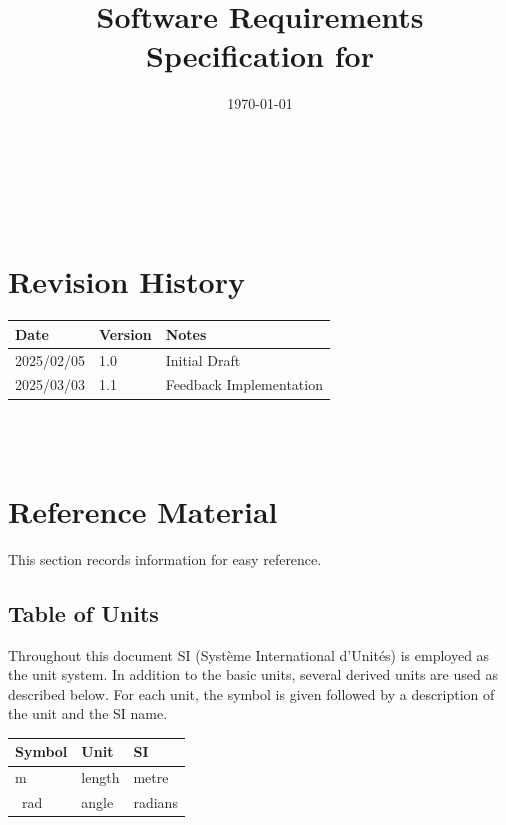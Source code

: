 \documentclass[12pt]{article}
\begin{document}
\title{Software Requirements Specification for \progname} 
\author{\authname}
\date{\today}
	
\maketitle

~\newpage


\tableofcontents

~\newpage

\section*{Revision History}

\begin{tabularx}{\textwidth}{p{3cm}p{2cm}X}
\toprule {\bf Date} & {\bf Version} & {\bf Notes}\\
\midrule
2025/02/05 & 1.0 & Initial Draft\\
2025/03/03 & 1.1 & Feedback Implementation\\
\bottomrule
\end{tabularx}

~\\

~\newpage

\section{Reference Material}

This section records information for easy reference.

\subsection{Table of Units}

Throughout this document SI (Syst\`{e}me International d'Unit\'{e}s) is employed
as the unit system.  In addition to the basic units, several derived units are
used as described below.  For each unit, the symbol is given followed by a
description of the unit and the SI name.
~\newline

\renewcommand{\arraystretch}{1.2}
\begin{longtable*}{l l l}
    \toprule		
    \textbf{Symbol} & \textbf{Unit} & \textbf{SI}\\
    \midrule 
    \si{\metre} & length & metre\\\
    \si{\radian} & angle & radians\\
    \bottomrule
  \end{longtable*}
\end{document}
